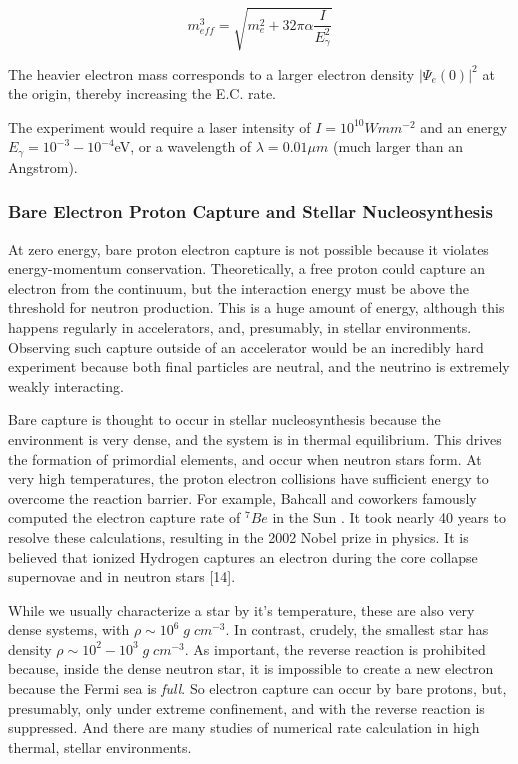 \documentclass[%
 aip,
 jmp,%
 amsmath,amssymb,
 reprint,%
]{revtex4-1}
\begin{document}
$$m_{eff}^{3}=\sqrt{m_{e}^{2}+32\pi\alpha\dfrac{I}{E^{2}_{\gamma}}}$$

The heavier electron mass corresponds to a larger electron density $\big\vert\Psi_{e}(0)\big\vert^{2}$ at the origin, thereby increasing the E.C. rate.

The experiment would require a laser intensity of $I=10^{10}Wmm^{-2}$ and an energy $E_{\gamma}=10^{-3}-10^{-4}$eV, or a wavelength of $\lambda=0.01\mu m$ (much larger than an Angstrom).  
  
\subsubsection{Bare Electron Proton Capture and Stellar Nucleosynthesis}

At zero energy, bare proton electron capture is not possible because it violates energy-momentum conservation. Theoretically, a free proton could capture an electron from the continuum, but the interaction energy must be above the threshold for neutron production.  This is a huge amount of energy, although this happens regularly in accelerators, and, presumably, in stellar environments.  Observing such capture outside of an accelerator would be an incredibly hard experiment  because both final particles are neutral, and the neutrino is extremely weakly interacting.  

Bare capture is thought to occur in stellar nucleosynthesis because the environment is very dense, and the system is in thermal equilibrium.  This drives the formation of primordial elements, and occur when neutron stars form.    At very high temperatures, the proton electron collisions have sufficient energy to overcome the reaction barrier.   For example, Bahcall and coworkers famously computed the electron capture rate of $^{7}Be$ in the Sun \cite{bahcall62,bahcall69}.  It took nearly 40 years to resolve these calculations, resulting in the 2002 Nobel prize in physics.  It is believed that ionized Hydrogen captures an electron during the core collapse supernovae and in neutron stars [14].   

While we usually characterize a star by it's temperature, these are also very dense systems, with $\rho\sim 10^6\;g\;cm^{-3}$.  In contrast, crudely, the smallest star has density $\rho\sim 10^{2}-10^{3}\;g\;cm^{-3}$.  As important, the reverse reaction is prohibited because, inside the dense neutron star, it is impossible to create a new electron because the Fermi sea is \emph{full}. So electron capture can occur by bare protons, but, presumably, only under extreme confinement, and with the reverse reaction is suppressed.   And there are many studies of numerical rate calculation in high thermal, stellar environments.   
\end{document}
